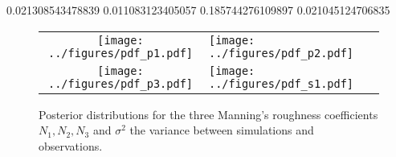    0.021308543478839   0.011083123405057   0.185744276109897   0.021045124706835



 \begin{figure}[h]
        \begin{tabular}{clc}
\texttt{[image: ../figures/pdf\_p1.pdf]} &
\texttt{[image: ../figures/pdf\_p2.pdf]} \\
\texttt{[image: ../figures/pdf\_p3.pdf]} &
\texttt{[image: ../figures/pdf\_s1.pdf]}
        \end{tabular}
        \caption{Posterior distributions for the three Manning's roughness coefficients $N_1,N_2,N_3$ 
and $\sigma^2$ the variance between simulations and observations.}
\label{fig:pdfs} 
        \end{figure}
